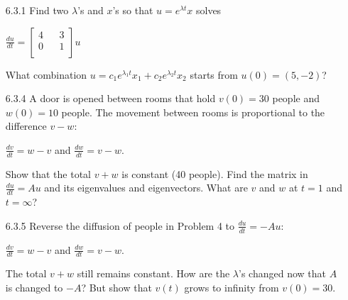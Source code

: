 \documentclass[10pt,twoside,reqno]{article}
\begin{document}
\begin{enumerate}
\item[6.3.1] Find two $\lambda$'s and $x$'s so that $u = e^{\lambda t}x$ solves\\
\begin{center}
$
$$
\frac{du}{dt} =
\begin{bmatrix}
4 && 3\\
0 && 1\\
\end{bmatrix}
u
$$
$\\
\end{center}
What combination $u = c_1e^{\lambda_1t}x_1 + c_2e^{\lambda_2t}x_2$ starts from $u(0) = (5, -2)$?\\


\vspace{3mm}
\item[6.3.4] A door is opened between rooms that hold $v(0) = 30$ people and $w(0) = 10$ people. The movement between rooms is proportional to the difference $v - w$:\\
\begin{center}
$\frac{dv}{dt} = w - v$ \hspace{3mm} and \hspace{3mm} $\frac{dw}{dt} = v - w$.\\
\end{center}
Show that the total $v + w$ is constant (40 people). Find the matrix in $\frac{du}{dt} = Au$ and its eigenvalues and eigenvectors. What are $v$ and $w$ at $t = 1$ and $t = \infty$?\\


\vspace{3mm}
\item[6.3.5] Reverse the diffusion of people in Problem 4 to $\frac{du}{dt} = -Au$:\\
\begin{center}
$\frac{dv}{dt} = w - v$ \hspace{3mm} and \hspace{3mm} $\frac{dw}{dt} = v - w$.\\
\end{center}
The total $v + w$ still remains constant. How are the $\lambda$'s changed now that $A$ is changed to $-A$? But show that $v(t)$ grows to infinity from $v(0) = 30$.\\



\end{enumerate}
\end{document}
